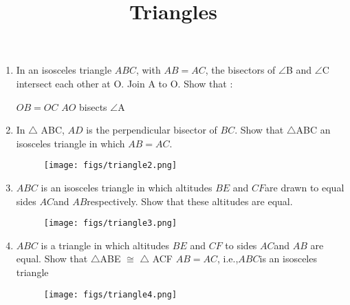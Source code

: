 \documentclass[12pt]{article}
\begin{document}
\title{\textbf{Triangles}}
\maketitle
\begin{center}
\end{center}

\begin{enumerate}
\section*{9$^{th}$ Maths - Chapter 7}

\item In an isosceles triangle $ABC$, with $AB = AC$, the bisectors of $\angle$B and $\angle$C intersect each other at O. Join A to O. Show that :
\begin{enumerate}
$OB = OC$  $AO$ bisects $\angle$A
\end{enumerate}
\item In $\triangle$ ABC, $AD$ is the perpendicular bisector of $BC$. Show that $\triangle$ABC an isosceles triangle in which $AB = AC$.
\begin{figure}[!h]
\begin{center}
\texttt{[image: figs/triangle2.png]}
\end{center}                                      \caption{}                                        \label{fig:Fig1}                                  \end{figure}
\item $ABC$ is an isosceles triangle in which altitudes $BE$ and $CF $are drawn to equal sides $AC $and $AB$respectively. Show that these altitudes are equal.
\begin{figure}[!h]
\begin{center}
\texttt{[image: figs/triangle3.png]}
 \end{center}
	\caption{}
\label{fig:Fig1}
\end{figure}
\item $ABC$ is a triangle in which altitudes $BE$ and $CF$ to sides $AC $and $AB$ are equal. Show that 
$\triangle$ABE $\cong$  $\triangle$ ACF
$AB = AC$, i.e.,$ABC$is an isosceles triangle
\begin{figure}[!h]
\begin{center}
\texttt{[image: figs/triangle4.png]}
\end{center}
	\caption{}                                     
\label{fig:Fig1}
\end{figure}

\end{enumerate}
\end{document}
